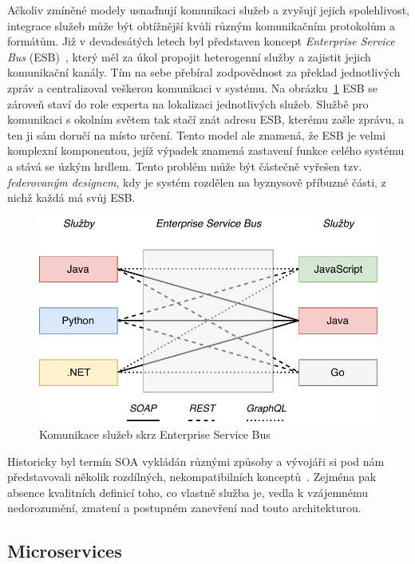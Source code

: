 Ačkoliv zmíněné modely usnaďnují komunikaci služeb a zvyšují jejich
spolehlivost, integrace služeb může být obtížnější kvůli různým
komunikačním protokolům a formátům. Již v devadesátých letech
byl představen koncept \textit{Enterprise Service Bus} (ESB)~\cite{chappell2004enterprise},
který měl za úkol propojit heterogenní služby a zajistit jejich
komunikační kanály. Tím na sebe přebíral zodpovědnost za překlad
jednotlivých zpráv a centralizoval veškerou komunikaci v systému.
Na obrázku~\ref{fig:enterprise-service-bus}
ESB se zároveň staví do role experta na lokalizaci jednotlivých služeb.
Službě pro komunikaci s okolním světem tak stačí znát adresu ESB, kterému
zašle zprávu, a ten ji sám doručí na místo určení. Tento model ale
znamená, že ESB je velmi komplexní komponentou, jejíž výpadek
znamená zastavení funkce celého systému a stává se úzkým hrdlem.
Tento problém může být částečně vyřešen tzv. \textit{federovaným designem},
kdy je systém rozdělen na byznysově příbuzné části, z nichž každá má
svůj ESB.

\begin{figure}
    \centering
    \includegraphics[keepaspectratio=true, width=0.8\linewidth]{figures/enterprise-service-bus.pdf}
    \caption{Komunikace služeb skrz Enterprise Service Bus}
    \label{fig:enterprise-service-bus}
\end{figure}

Historicky byl termín SOA vykládán různými způsoby a vývojáři si
pod nám představovali několik rozdílných, nekompatibilních
konceptů~\cite{fowler2005serviceorientedambiguity}.
Zejména pak absence kvalitních definicí toho, co vlastně
služba je, vedla k vzájemnému nedorozumění, zmatení a postupném
zanevření nad touto architekturou.

\subsection{Microservices}

